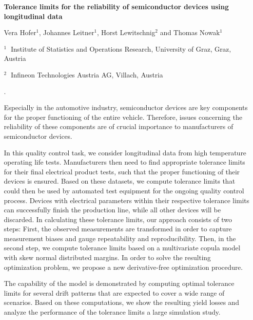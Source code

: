 \documentclass[12pt]{article}
\begin{document}
\begin{flushleft}


{\LARGE\bf Tolerance limits for the reliability of semiconductor devices using longitudinal data}


\vspace{1.0cm}

Vera Hofer$^1$, Johannes Leitner$^1$, Horst Lewitschnig$^2$ and Thomas Nowak$^1$

\begin{description}

\item $^1 \;$ Institute of Statistics and Operations Research, University of Graz, Graz, Austria
\item $^2 \;$ Infineon Technologies Austria AG, Villach, Austria

\end{description}

\end{flushleft}

\vspace{0.75cm}

. 

Especially in the automotive industry, semiconductor devices are key components for the proper functioning of the entire vehicle. Therefore, issues concerning the reliability of these components are of crucial importance to manufacturers of semiconductor devices.

In this quality control task, we consider longitudinal data from high temperature operating life tests. Manufacturers then need to find appropriate tolerance limits for their final electrical product tests, such that the proper functioning of their devices is ensured. Based on these datasets, we compute tolerance limits that could then be used by automated test equipment for the ongoing quality control process. Devices with electrical parameters within their respective tolerance limits can successfully finish the production line, while all other devices will be discarded. In calculating these tolerance limits, our approach consists of two steps: First, the observed measurements are transformed in order to capture measurement biases and gauge repeatability and reproducibility. Then, in the second step, we compute tolerance limits based on a multivariate copula model with skew normal distributed margins. In order to solve the resulting optimization problem, we propose a new derivative-free optimization procedure.

The capability of the model is demonstrated by computing optimal tolerance limits for several drift patterns that are expected to cover a wide range of scenarios. Based on these computations, we show the resulting yield losses and analyze the performance of the tolerance limits a large simulation study.
\end{document}

